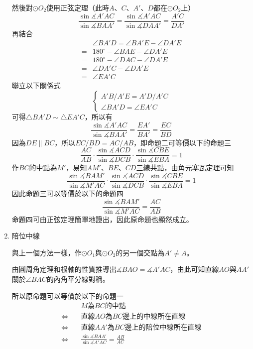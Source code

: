 \documentclass[12pt]{article}
\begin{document}
\begin{mybox}[Answer 11*]{7em}{1em}{-0.3em}
\begin{enumerate}[label = 方法 \arabic*：]
$$        $$
        然後對$\odot{O_2}$使用正弦定理（此時$A$、$C$、$A'$、$D$都在$\odot{O_2}$上）
        $$
            \frac{\sin{\measuredangle{A'AC}}}{\sin{\measuredangle{BAA'}}}=\frac{\sin{\measuredangle{A'AC}}}{\sin{\measuredangle{DAA'}}}=\frac{A'C}{DA'}
        $$
        再結合
        \begin{align*}
            &\angle{BA'D}=\angle{BA'E}-\angle{DA'E}\\
            =&180^{\circ}-\angle{BAE}-\angle{DA'E}\\
            =&180^{\circ}-\angle{DAC}-\angle{DA'E}\\
            =&\angle{DA'C}-\angle{DA'E}\\
            =&\angle{EA'C}
        \end{align*}
        聯立以下關係式
        $$
            \begin{cases}
                A'B/A'E=A'D/A'C\\
                \angle{BA'D}=\angle{EA'C}
            \end{cases}
        $$
        可得$\triangle{BA'D}\sim\triangle{EA'C}$，所以有
        $$
            \frac{\sin{\measuredangle{A'AC}}}{\sin{\measuredangle{BAA'}}}=\frac{EA'}{BA'}=\frac{EC}{BD}
        $$
        因為$DE\parallel BC$，所以$EC/BD=AC/AB$，即命題二可等價以下的命題三
        $$
            \frac{AC}{AB}
            \cdot\frac{\sin{\measuredangle{ACD}}}{\sin{\measuredangle{DCB}}}
            \cdot\frac{\sin{\measuredangle{CBE}}}{\sin{\measuredangle{EBA}}} = 1
        $$
        作$BC$的中點為$M'$，易知$AM'$、$BE$、$CD$三線共點，由角元塞瓦定理可知
        $$
            \frac{\sin{\measuredangle{BAM'}}}{\sin{\measuredangle{M'AC}}}
            \cdot\frac{\sin{\measuredangle{ACD}}}{\sin{\measuredangle{DCB}}}
            \cdot\frac{\sin{\measuredangle{CBE}}}{\sin{\measuredangle{EBA}}} = 1
        $$
        因此命題三可以等價於以下的命題四
        $$
            \frac{\sin{\measuredangle{BAM'}}}{\sin{\measuredangle{M'AC}}}=\frac{AC}{AB}
        $$
        命題四可由正弦定理簡單地證出，因此原命題也顯然成立。
        \item 陪位中線
        
        與上一個方法一樣，作$\odot{O_1}$與$\odot{O_2}$的另一個交點為$A'\neq A$。
        
        由圓周角定理和根軸的性質推導出$\measuredangle{BAO}=\measuredangle{A'AC}$，由此可知直線$AO$與$AA'$關於$\angle{BAC}$的內角平分線對稱。

        所以原命題可以等價於以下的命題一
        \begin{align*}
            &\text{$M$為$BC$的中點}\\
            \Leftrightarrow\quad&\text{直線$AO$為$BC$邊上的中線所在直線}\\
            \Leftrightarrow\quad&\text{直線$AA'$為$BC$邊上的陪位中線所在直線}\\
            \Leftrightarrow\quad&\frac{\sin{\measuredangle{BAA'}}}{\sin{\measuredangle{A'AC}}}=\frac{AB}{AC}
        \end{align*}


\end{enumerate}
\end{mybox}
\end{document}
